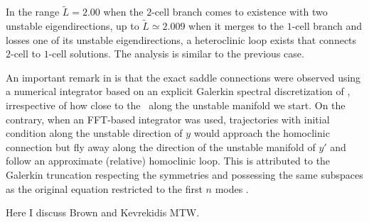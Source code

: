 In the range $\tilde{L}=2.00$ when the $2$-cell branch comes to
existence with two unstable eigendirections, up to $\tilde{L}
\simeq 2.009$ when it merges to the $1$-cell branch and losses
one of its unstable eigendirections, a heteroclinic loop exists
that connects $2$-cell to $1$-cell solutions. The analysis is
similar to the previous case.

An important remark in  is that the exact
saddle connections were observed using a numerical integrator
based on an explicit Galerkin spectral discretization of \KSe,
irrespective of how close to the \eqv\ along the unstable
manifold we start. On the contrary, when an FFT-based
integrator was used, trajectories with initial condition along
the unstable direction of $y$ would approach the homoclinic
connection but fly away along the direction of the unstable
manifold of $y'$ and follow an approximate (relative)
homoclinic loop. This is attributed to the Galerkin truncation
respecting the symmetries and possessing the same subspaces as
the original equation restricted to the first $n$ modes .

Here I discuss Brown and Kevrekidis MTW.
